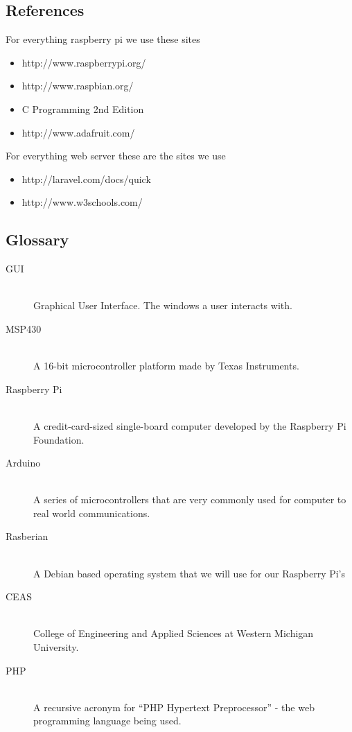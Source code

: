 \documentclass{report}
\begin{document}
\subsection*{References}
For everything raspberry pi we use these sites
\begin{itemize}
\item http://www.raspberrypi.org/
\item http://www.raspbian.org/
\item C Programming 2nd Edition
\item http://www.adafruit.com/
\end{itemize}
For everything web server these are the sites we use
\begin{itemize}
\item http://laravel.com/docs/quick
\item http://www.w3schools.com/
\end{itemize}
\newpage
\subsection*{Glossary}
\begin{description}
\item [GUI] \hfill \\
Graphical User Interface. The windows a user interacts with.
\item [MSP430] \hfill \\
A 16-bit microcontroller platform made by Texas Instruments.
\item [Raspberry Pi] \hfill \\
 A credit-card-sized single-board computer developed by the Raspberry Pi Foundation.
\item [Arduino] \hfill \\
A series of microcontrollers that are very commonly used for computer to real world communications.
\item [Rasberian] \hfill \\
 A Debian based operating system that we will use for our Raspberry Pi’s
\item [CEAS] \hfill \\
College of Engineering and Applied Sciences at Western Michigan University.
\item [PHP] \hfill \\
A recursive acronym for “PHP Hypertext Preprocessor” - the web programming language being used.
\end{description}
\newpage
\end{document}
